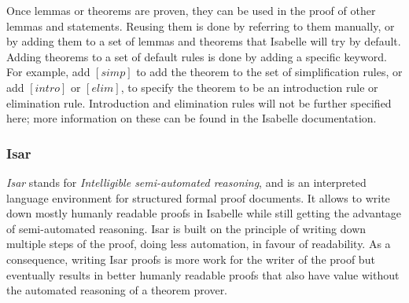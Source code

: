 Once lemmas or theorems are proven, they can be used in the proof of other lemmas and statements. Reusing them is done by referring to them manually, or by adding them to a set of lemmas and theorems that Isabelle will try by default. Adding theorems to a set of default rules is done by adding a specific keyword. For example, add $[simp]$ to add the theorem to the set of simplification rules, or add $[intro]$ or $[elim]$, to specify the theorem to be an introduction rule or elimination rule. Introduction and elimination rules will not be further specified here; more information on these can be found in the Isabelle documentation.

\subsubsection{Isar}
\textit{Isar} stands for \textit{Intelligible semi-automated reasoning}, and is an interpreted language environment for structured formal proof documents. It allows to write down mostly humanly readable proofs in Isabelle while still getting the advantage of semi-automated reasoning. Isar is built on the principle of writing down multiple steps of the proof, doing less automation, in favour of readability. As a consequence, writing Isar proofs is more work for the writer of the proof but eventually results in better humanly readable proofs that also have value without the automated reasoning of a theorem prover.

